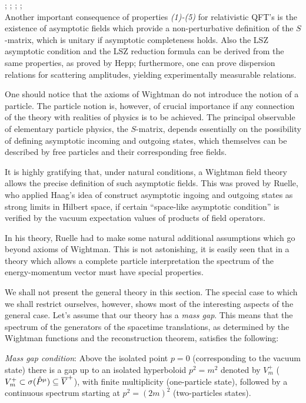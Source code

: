 \documentclass[../main/main.tex]{subfiles}
\begin{document}
\cite{Ruelle:1962}; \cite{Hepp:1965}; \cite[Chapter II.4]{Haag_1996}; \cite[Chapters 6]{Jost.:1965}; \cite[Sections 6.1-6.2]{Strocchi_2013}\\

Another important consequence of properties \textit{(1)-(5)} for relativistic QFT's is the existence of asymptotic fields which provide a non-perturbative definition of the $S$-matrix, which is unitary if asymptotic completeness holds. Also the LSZ asymptotic condition and the LSZ reduction formula can be derived from the same properties, as proved by Hepp; furthermore, one can prove dispersion relations for scattering amplitudes, yielding experimentally measurable relations. 

\skipline%

One should notice that the axioms of Wightman do not introduce the notion of a particle. The particle notion is, however, of crucial importance if any connection of the theory with realities of physics is to be achieved. The principal observable of elementary particle physics, the $S$-matrix, depends essentially on the possibility of defining asymptotic incoming and outgoing states, which themselves can be described by free particles and their corresponding free fields. 

It is highly gratifying that, under natural conditions, a Wightman field theory allows the precise definition of such asymptotic fields. This was proved by Ruelle, who applied Haag's idea of construct asymptotic ingoing and outgoing states as strong limits in Hilbert space, if certain ``space-like asymptotic condition'' is verified by the vacuum expectation values of products of field operators. 

In his theory, Ruelle had to make some natural additional assumptions which go beyond axioms of Wightman. This is not astonishing, it is easily seen that in a theory which allows a complete particle interpretation the spectrum of the energy-momentum vector must have special properties. 

\skipline%

We shall not present the general theory in this section. The special case to which we shall restrict ourselves, however, shows most of the interesting aspects of the general case. Let's assume that our theory has a \emph{mass gap}. This means that the spectrum of the generators of the spacetime translations, as determined by the Wightman functions and the reconstruction theorem, satisfies the following:

\emph{Mass gap condition}: Above the isolated point $p=0$ (corresponding to the vacuum state) there is a gap up to an isolated hyperboloid $p^2=m^2$ denoted by $V_m^+$ ($V_m^+\subset\sigma(\hat{P}^\mu)\subseteq\overline V^+$), with finite multiplicity (one-particle state), followed by a continuous spectrum starting at $p^2=(2m)^2$ (two-particles states). 
\end{document}
